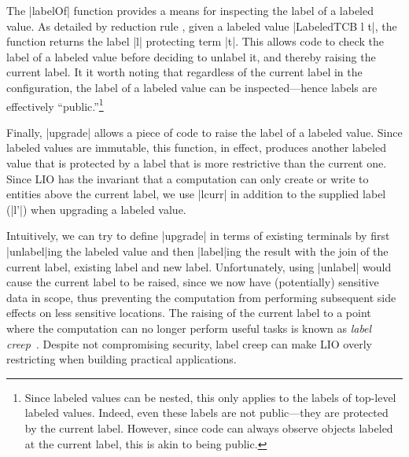The |labelOf| function provides a means for inspecting the label of a
labeled value.
%
As detailed by reduction rule , given a labeled value
|LabeledTCB l t|, the function returns the label |l| protecting term
|t|.
%
This allows code to check the label of a labeled value before deciding
to unlabel it, and thereby raising the current label.
%
It it worth noting that regardless of the current label in the
configuration, the label of a labeled value can be
inspected---hence labels are effectively ``public.''\footnote{
  Since labeled values can be nested, this only applies to
  the labels of top-level labeled values.
  Indeed, even these labels are not public---they are protected by the
  current label.
  However, since code can always observe objects labeled at the
  current label, this is akin to being public.
}

Finally, |upgrade| allows a piece of code to raise the label of a
labeled value.
%
Since labeled values are immutable, this function, in effect, produces
another labeled value that is protected by a label that is more restrictive
than the current one.
%
Since LIO has the invariant that a computation can only create or
write to entities above the current label, we use |lcurr| in addition
to the supplied label (|l'|) when upgrading a labeled value.

Intuitively, we can try to define |upgrade| in terms of existing
terminals by first |unlabel|ing the labeled value and then |label|ing
the result with the join of the current label, existing label and new
label.
%
Unfortunately, using |unlabel| would cause the current label to be
raised, since we now have (potentially) sensitive data in scope, thus
preventing the computation from performing subsequent side effects on
less sensitive locations.
%
%
The raising of the current label to a point where the computation can
no longer perform useful tasks is known as \emph{label
creep}~\cite{sabelfeld:language-based-iflow}.
%
%
Despite not compromising security, label creep can make LIO overly
restricting when building practical applications. 

